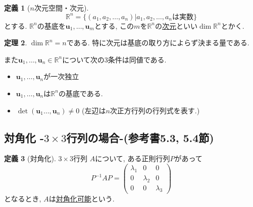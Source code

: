 \documentclass[dvipdfmx,a4paper,11pt]{article}
\newcommand{\R}{\mathbb{R}}
\theoremstyle{definition}
\newtheorem{thm}{定理}
\newtheorem{dfn}[thm]{定義}
\begin{document}
 \begin{tcolorbox}[
    colback = white,
    colframe = green!35!black,
    fonttitle = \bfseries,
    breakable = true]
    \begin{dfn}[$n$次元空間・次元]
$$
\R^n  = \{ (a_1, a_2, \ldots, a_n) | \text{$a_1, a_2, \ldots, a_n$は実数}\} 
$$
とする. 
$\R^n$の基底を$\bm{u}_1, \ldots, \bm{u}_m$とする, この$m$を$\R^n$の\underline{次元}といい$\dim \R^n$とかく.
    \end{dfn}
 \end{tcolorbox}
 
 
  \begin{tcolorbox}[
    colback = white,
    colframe = green!35!black,
    fonttitle = \bfseries,
    breakable = true]
    \begin{thm}
$\dim \R^n =n$である. 特に次元は基底の取り方によらず決まる量である.

また$\bm{u}_1, \ldots, \bm{u}_n \in \R^n$について次の3条件は同値である.
 \begin{itemize}
 \setlength{\parskip}{0cm}
  	\setlength{\itemsep}{0pt} 
 \item $\bm{u}_1, \ldots, \bm{u}_n$が一次独立
  \item $\bm{u}_1, \ldots, \bm{u}_n$は$\R^n$の基底である. 
\item  $\det 
(\bm{u}_1 \ldots,\bm{u}_n)
  \neq 0$ (左辺は$n$次正方行列の行列式を表す.)
  \end{itemize}
    \end{thm}
 \end{tcolorbox}
 

\subsection{対角化 -$3 \times 3$行列の場合-(参考書5.3, 5.4節)}

  \begin{tcolorbox}[
    colback = white,
    colframe = green!35!black,
    fonttitle = \bfseries,
    breakable = true]
    \begin{dfn}[対角化]
    
$3 \times 3$行列
$A$について, ある正則行列$P$があって
$$
P^{-1} A P=
\begin{pmatrix}
\lambda_1& 0 &0\\
0& \lambda_2 &0\\
0 & 0& \lambda_3
\end{pmatrix}
$$
となるとき, $A$は\underline{対角化可能}という.
  \end{dfn}
 \end{tcolorbox}
\end{document}
